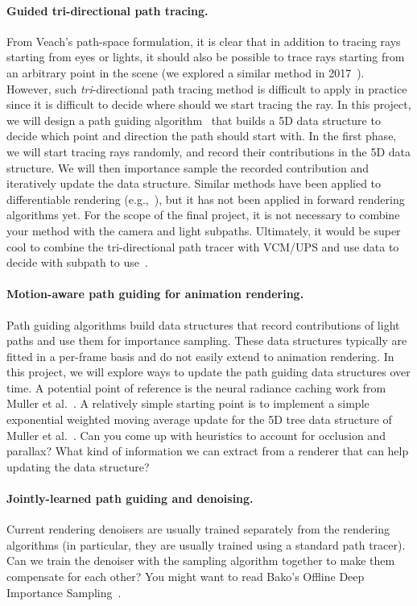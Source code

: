 \paragraph{Guided tri-directional path tracing.}
From Veach's path-space formulation, it is clear that in addition to tracing rays starting from eyes or lights, it should also be possible to trace rays starting from an arbitrary point in the scene (we explored a similar method in 2017~\cite{Anderson:2017:AED}). 
However, such \emph{tri}-directional path tracing method is difficult to apply in practice since it is difficult to decide where should we start tracing the ray. 
In this project, we will design a path guiding algorithm~\cite{Lafortune:1995:5RV,Muller:2017:PPG} that builds a 5D data structure to decide which point and direction the path should start with.
In the first phase, we will start tracing rays randomly, and record their contributions in the 5D data structure.
We will then importance sample the recorded contribution and iteratively update the data structure.
Similar methods have been applied to differentiable rendering (e.g.,~\cite{Yan:2022:EEB}), but it has not been applied in forward rendering algorithms yet.
For the scope of the final project, it is not necessary to combine your method with the camera and light subpaths.
Ultimately, it would be super cool to combine the tri-directional path tracer with VCM/UPS and use data to decide with subpath to use~\cite{Grittmann:2022:EMI}.

\paragraph{Motion-aware path guiding for animation rendering.}
Path guiding algorithms build data structures that record contributions of light paths and use them for importance sampling.
These data structures typically are fitted in a per-frame basis and do not easily extend to animation rendering. 
In this project, we will explore ways to update the path guiding data structures over time.
A potential point of reference is the neural radiance caching work from Muller et al.~\cite{Muller:2021:RNR}.
A relatively simple starting point is to implement a simple exponential weighted moving average update for the 5D tree data structure of Muller et al.~\cite{Muller:2017:PPG}.
Can you come up with heuristics to account for occlusion and parallax? What kind of information we can extract from a renderer that can help updating the data structure?

\paragraph{Jointly-learned path guiding and denoising.}
Current rendering denoisers are usually trained separately from the rendering algorithms (in particular, they are usually trained using a standard path tracer). Can we train the denoiser with the sampling algorithm together to make them compensate for each other? You might want to read Bako's Offline Deep Importance Sampling~\cite{Bako:ODI:2019}.

